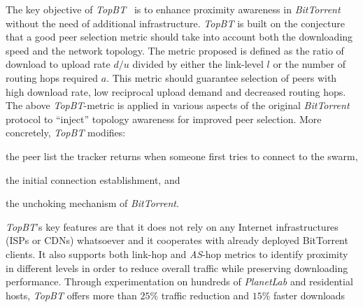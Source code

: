 The key objective of \emph{TopBT}~\cite{RTLCGZ2010} is to enhance
proximity awareness in {\sl BitTorrent}
without the need of additional infrastructure. 
\emph{TopBT} is built on the conjecture that
a good peer selection metric should take into account both the
downloading speed and the network topology. The metric proposed is defined as
the ratio of download to upload rate ${d}/{u}$
divided by either the link-level $l$ or the number of routing hops required $a$.
This metric should guarantee selection of peers with high download rate, low
reciprocal upload demand and decreased routing hops.
The above \emph{TopBT}-metric is applied in various
aspects of the original {\sl BitTorrent} protocol to ``inject'' topology
awareness for improved peer selection. More concretely, \emph{TopBT} modifies: 
\begin{inparaenum}[1)]
\item the peer list the tracker returns when someone first tries
to connect to the swarm, 
\item the initial connection establishment, and 
\item the unchoking mechanism of {\sl BitTorrent}.
\end{inparaenum}
\emph{TopBT}'s key features are that it does not rely on any Internet infrastructures
(ISPs or CDNs) whatsoever and it cooperates with already deployed BitTorrent clients.
It also supports both link-hop and \emph{AS}-hop metrics to identify proximity in
different levels in order to reduce overall traffic while preserving downloading
performance.
%
Through experimentation on hundreds of {\it PlanetLab} and residential hosts,
\emph{TopBT} offers more than $25\%$ traffic reduction and $15\%$ faster downloads
